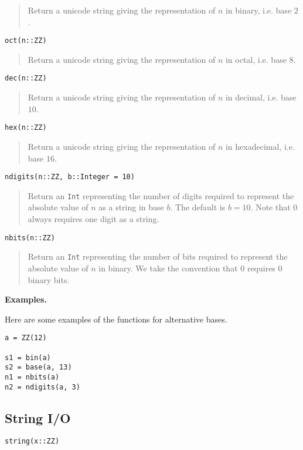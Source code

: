 \documentclass[a4paper,10pt]{article}
\newcommand{\code}{\lstinline}
\newcommand{\desc}[1]{\vspace{-3mm}\begin{quote}#1\end{quote}}
\begin{document}
{{{{{{\desc{Return a unicode string giving the representation of $n$ in binary, i.e. base $2$.}

\begin{lstlisting}
oct(n::ZZ)
\end{lstlisting}

\desc{Return a unicode string giving the representation of $n$ in octal, i.e. base $8$.}

\begin{lstlisting}
dec(n::ZZ)
\end{lstlisting}

\desc{Return a unicode string giving the representation of $n$ in decimal, i.e. base $10$.}

\begin{lstlisting}
hex(n::ZZ)
\end{lstlisting}

\desc{Return a unicode string giving the representation of $n$ in hexadecimal, i.e. base $16$.}

\begin{lstlisting}
ndigits(n::ZZ, b::Integer = 10)
\end{lstlisting}

\desc{Return an \code{Int} representing the number of digits required to represent the
absolute value of $n$ as a string in base $b$. The default is $b = 10$. Note that $0$
always requires one digit as a string.}

\begin{lstlisting}
nbits(n::ZZ)
\end{lstlisting}

\desc{Return an \code{Int} representing the number of bits required to represent the
absolute value of $n$ in binary. We take the convention that $0$ requires $0$ binary 
bits.}

\textbf{Examples.}

Here are some examples of the functions for alternative bases.

\begin{lstlisting}
a = ZZ(12)

s1 = bin(a)
s2 = base(a, 13)
n1 = nbits(a)
n2 = ndigits(a, 3)
\end{lstlisting}

\subsection{String I/O}

\begin{lstlisting}
string(x::ZZ)
\end{lstlisting}

}}}}}}
\end{document}
